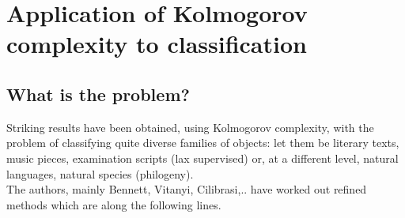 \section{Application of Kolmogorov complexity to classification}
\subsection{What is the problem?}\label{ss:what}
Striking results have been obtained, using Kolmogorov complexity,
with the problem of classifying quite diverse families of objects:
let them be literary texts, music pieces,
examination scripts (lax supervised) or, at a different level,
natural languages,
natural species (philogeny).
\\
The authors, mainly Bennett, Vitanyi, Cilibrasi,..
have worked out refined methods which are along the following lines.
